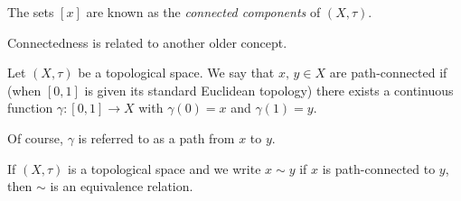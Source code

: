 The sets $[x]$ are known as the \emph{connected components} of $(X,\tau)$.

Connectedness is related to  another older concept.

\begin{definition}\label{D;path-connected}
Let $(X,\tau)$ be a topological space.
We say that $x,\,y\in X$ are path-connected if 
(when $[0,1]$ is given its standard Euclidean topology)
there exists a continuous
function $\gamma:[0,1]\rightarrow X$ with
$\gamma(0)=x$ and $\gamma(1)=y$.
\end{definition}

Of course, $\gamma$ is referred to as a path from $x$ to $y$.


\begin{lemma}\label{L;path-connected equivalence}
If $(X,\tau)$ is a topological space and
we write $x\sim y$ if $x$ is path-connected
to $y$, then $\sim$ is an equivalence relation.
\end{lemma}
